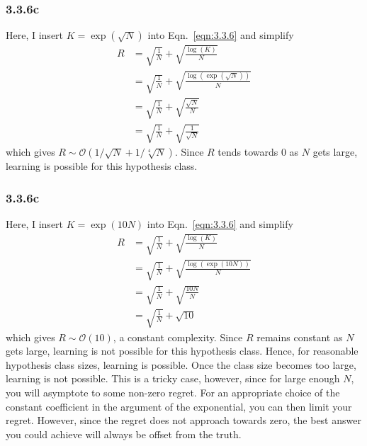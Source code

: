 \documentclass[12pt]{amsart}
\begin{document}
\subsubsection*{3.3.6c}

Here, I insert $K = \exp(\sqrt{N})$ into Eqn.~\ref{eqn:3.3.6} and simplify
\begin{equation}
\begin{split}
R & = \sqrt{\frac{1}{N}} + \sqrt{\frac{\log(K)}{N}} \\
& = \sqrt{\frac{1}{N}} + \sqrt{\frac{\log(\exp(\sqrt{N}))}{N}} \\
& = \sqrt{\frac{1}{N}} + \sqrt{\frac{\sqrt{N}}{N}} \\
& = \sqrt{\frac{1}{N}} + \sqrt{\frac{1}{\sqrt{N}}}
\end{split}
\end{equation}
which gives $R {\sim} \mathcal{O}(1/\sqrt{N} + 1/\sqrt[4]{N})$.  Since $R$ tends towards 0 as $N$ gets large, learning is possible for this hypothesis class.

\subsubsection*{3.3.6c}

Here, I insert $K = \exp(10N)$ into Eqn.~\ref{eqn:3.3.6} and simplify
\begin{equation}
\begin{split}
R & = \sqrt{\frac{1}{N}} + \sqrt{\frac{\log(K)}{N}} \\
& = \sqrt{\frac{1}{N}} + \sqrt{\frac{\log(\exp(10N))}{N}} \\
& = \sqrt{\frac{1}{N}} + \sqrt{\frac{10N}{N}} \\ 
& = \sqrt{\frac{1}{N}} + \sqrt{10}
\end{split}
\end{equation}
which gives $R {\sim} \mathcal{O}(10)$, a constant complexity.  Since $R$ remains constant as $N$ gets large, learning is not possible for this hypothesis class.  Hence, for reasonable hypothesis class sizes, learning is possible.  Once the class size becomes too large, learning is not possible.  This is a tricky case, however, since for large enough $N$, you will asymptote to some non-zero regret.  For an appropriate choice of the constant coefficient in the argument of the exponential, you can then limit your regret.  However, since the regret does not approach towards zero, the best answer you could achieve will always be offset from the truth.
\end{document}
